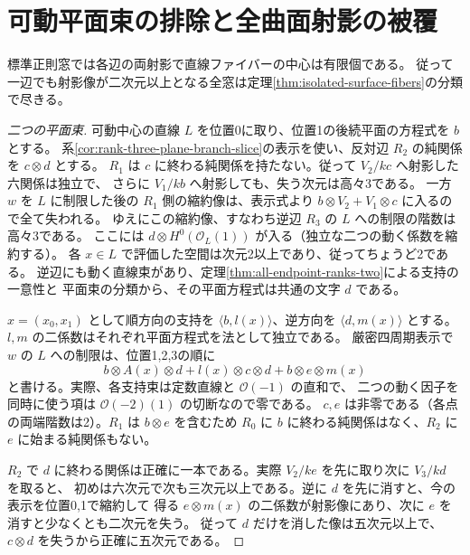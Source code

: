 \section{可動平面束の排除と全曲面射影の被覆}
\label{sec:exclude-moving-plane-pencils}
\begin{theorem}\label{thm:no-moving-plane-pencils}
標準正則窓では各辺の両射影で直線ファイバーの中心は有限個である。
従って一辺でも射影像が二次元以上となる全窓は定理\ref{thm:isolated-surface-fibers}の分類で尽きる。
\end{theorem}
\begin{proof}[二つの平面束]
可動中心の直線 $L$ を位置0に取り、位置1の後続平面の方程式を $b$ とする。
系\ref{cor:rank-three-plane-branch-slice}の表示を使い、反対辺 $R_2$ の純関係を $c\otimes d$ とする。
$R_1$ は $c$ に終わる純関係を持たない。従って $V_2/kc$ へ射影した六関係は独立で、
さらに $V_1/kb$ へ射影しても、失う次元は高々3である。
一方 $w$ を $L$ に制限した後の $R_1$ 側の縮約像は、表示式より
$b\otimes V_2+ V_1\otimes c$ に入るので全て失われる。
ゆえにこの縮約像、すなわち逆辺 $R_3$ の $L$ への制限の階数は高々3である。
ここには $d\otimes H^0(\mathcal O_L(1))$ が入る（独立な二つの動く係数を縮約する）。
各 $x\in L$ で評価した空間は次元2以上であり、従ってちょうど2である。
逆辺にも動く直線束があり、定理\ref{thm:all-endpoint-ranks-two}による支持の一意性と
平面束の分類から、その平面方程式は共通の文字 $d$ である。

$x=(x_0,x_1)$ として順方向の支持を $\langle b,l(x)\rangle$、逆方向を
$\langle d,m(x)\rangle$ とする。$l,m$ の二係数はそれぞれ平面方程式を法として独立である。
厳密四周期表示で $w$ の $L$ への制限は、位置1,2,3の順に
\[
 b\otimes A(x)\otimes d+
 l(x)\otimes c\otimes d+
 b\otimes e\otimes m(x)
\]
と書ける。実際、各支持束は定数直線と $\mathcal O(-1)$ の直和で、
二つの動く因子を同時に使う項は $\mathcal O(-2)(1)$ の切断なので零である。
$c,e$ は非零である（各点の両端階数は2）。$R_1$ は $b\otimes e$ を含むため
$R_0$ に $b$ に終わる純関係はなく、$R_2$ に $e$ に始まる純関係もない。

$R_2$ で $d$ に終わる関係は正確に一本である。実際 $V_2/ke$ を先に取り次に $V_3/kd$ を取ると、
初めは六次元で次も三次元以上である。逆に $d$ を先に消すと、今の表示を位置0,1で縮約して
得る $e\otimes m(x)$ の二係数が射影像にあり、次に $e$ を消すと少なくとも二次元を失う。
従って $d$ だけを消した像は五次元以上で、$c\otimes d$ を失うから正確に五次元である。
\end{proof}


